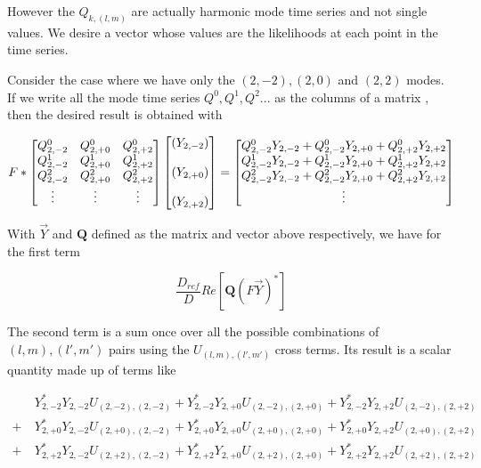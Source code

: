 However the $Q_{k,(l,m)}$ are actually harmonic mode time series and not single values. We desire a vector whose values are the likelihoods at each point in the time series. 

Consider the case where we have only the $(2,-2), (2,0)$ and $(2,2)$ modes. If we write all the mode time series $Q^0, Q^1, Q^2...$ as the columns of a matrix , then the desired result is obtained with

\begin{align}
F*
\begin{bmatrix}
Q^0_{2,-2} & Q^0_{2,+0} & Q^0_{2,+2} \\
Q^1_{2,-2} & Q^1_{2,+0} & Q^1_{2,+2} \\ 
Q^2_{2,-2} & Q^2_{2,+0} & Q^2_{2,+2} \\
\vdots & \vdots & \vdots
\end{bmatrix}
\begin{bmatrix}
\left(Y_{2,-2}\right)\\
\hspace{0mm} \\
\left(Y_{2,+0}\right) \\
\hspace{0mm} \\
\left(Y_{2,+2}\right) \\
\end{bmatrix}
=
\begin{bmatrix}
Q^0_{2,-2} Y_{2,-2} + Q^0_{2,-2}Y_{2,+0} + Q^0_{2,+2}Y_{2,+2} \\
Q^1_{2,-2} Y_{2,-2} + Q^1_{2,-2}Y_{2,+0} + Q^1_{2,+2}Y_{2,+2} \\
Q^2_{2,-2} Y_{2,-2} + Q^2_{2,-2}Y_{2,+0} + Q^2_{2,+2}Y_{2,+2} \\
\vdots
\end{bmatrix}
\end{align}

With $\vec{Y}$ and $\mathbf{Q}$ defined as the matrix and vector above respectively, we have for the first term

\begin{equation}
\frac{D_{ref}}{D}Re\left[\mathbf{Q}\left(F\vec{Y}\right)^{*}\right]
\end{equation}

The second term is a sum once over all the possible combinations of $(l,m), (l',m')$ pairs using the $U_{(l,m),(l',m')}$ cross terms. Its result is a scalar quantity made up of terms like

\begin{align}
&Y_{2,-2}^{*}Y_{2,-2}U_{(2,-2),(2,-2)} + Y_{2,-2}^{*}Y_{2,+0}U_{(2,-2),(2,+0)} + Y_{2,-2}^{*}Y_{2,+2}U_{(2,-2),(2,+2)} \\ 
 +  \ &Y_{2,+0}^{*}Y_{2,-2}U_{(2,+0),(2,-2)} + Y_{2,+0}^{*}Y_{2,+0}U_{(2,+0),(2,+0)} + Y_{2,+0}^{*}Y_{2,+2}U_{(2,+0),(2,+2)} \\ 
+ \  &Y_{2,+2}^{*}Y_{2,-2}U_{(2,+2),(2,-2)} + Y_{2,+2}^{*}Y_{2,+0}U_{(2,+2),(2,+0)} + Y_{2,+2}^{*}Y_{2,+2}U_{(2,+2),(2,+2)}
\end{align}


